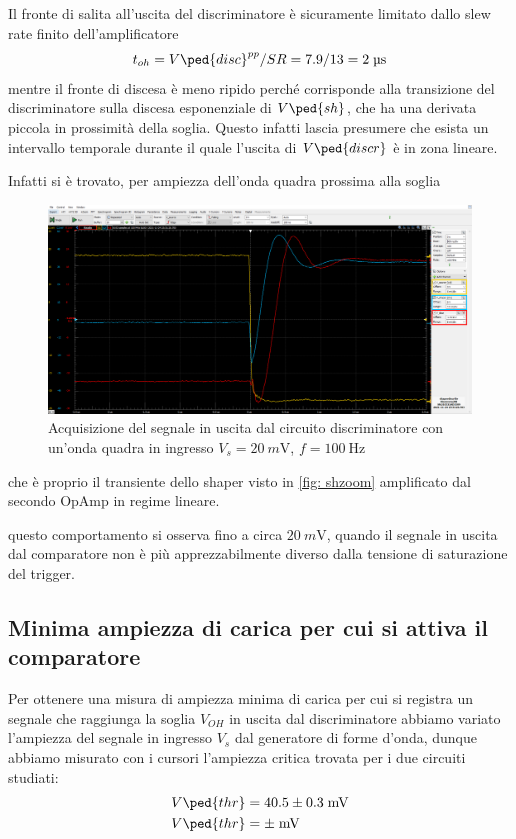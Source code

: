 \documentclass[10pt,a4paper]{article}
\begin{document}
Il fronte di salita all'uscita del discriminatore è sicuramente limitato dallo
slew rate finito dell'amplificatore
\[
t_{oh} = V\ped{disc}^{pp}/SR = 7.9 / 13 = 2 \; \si{\micro\s}
\]
mentre il fronte di discesa è meno ripido perché corrisponde alla transizione
del discriminatore sulla discesa esponenziale di $V\ped{sh}$, che ha una derivata
piccola in prossimità della soglia. Questo infatti lascia presumere che esista
un intervallo temporale durante il quale l'uscita di $V\ped{discr}$ è in zona
lineare.

Infatti si è trovato, per ampiezza dell'onda quadra prossima alla soglia
\begin{figure}[htbp]
\centering
\includegraphics[scale=0.335]{shdiscthr}
\caption{Acquisizione del segnale in uscita dal circuito discriminatore con
un'onda quadra in ingresso $V_s = \SI{20}{m\V}$, $f = \SI{100}{\Hz}$
\label{fig: discrthr}}
\end{figure}
che è proprio il transiente dello shaper visto in \ref{fig: shzoom} amplificato
dal secondo OpAmp in regime lineare.

questo comportamento si osserva fino a circa $\SI{20}{m\V}$, quando il segnale
in uscita dal comparatore non è più apprezzabilmente diverso dalla tensione di
saturazione del trigger.

\subsection{Minima ampiezza di carica per cui si attiva il comparatore}
Per ottenere una misura di ampiezza minima di carica per cui si registra un
segnale che raggiunga la soglia $V_{OH}$ in uscita dal discriminatore abbiamo
variato l'ampiezza del segnale in ingresso $V_s$ dal generatore di forme
d'onda, dunque abbiamo misurato con i cursori l'ampiezza critica trovata per
i due circuiti studiati:
\begin{align*}
V\ped{thr} &= 40.5 \pm 0.3 \; \si{m\V} \\ 
V\ped{thr} &=  \pm  \; \si{m\V}
\end{align*}
\end{document}
